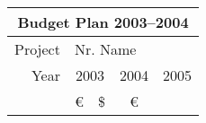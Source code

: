 \documentclass{article}
\begin{document}
	\begin{tabular}{|l|c|c|c|} \hline
		\multicolumn{4}{|c|}{\rule[-0.3cm]{0mm}{0.8cm} \bfseries
			Budget Plan 2003--2004} \\
		\hline \hline
		\rule[-0.4cm]{0mm}{1cm}Project
		& \multicolumn{3}{l|}{Nr. \usebox{\kkk}\hspace{0.5cm}
		\vline\hspace{0.5cm}Name\usebox{\kkk}\usebox{\kkk}\usebox{\kkk}\usebox{\kkk}} \\
		\hline
		\multicolumn{1}{|r|}{Year} & 2003 & 2004 & 2005 \\ \cline{2-4}
		& \euro\ \vline\ \$ & \euro
	\end{tabular}
\end{document}
